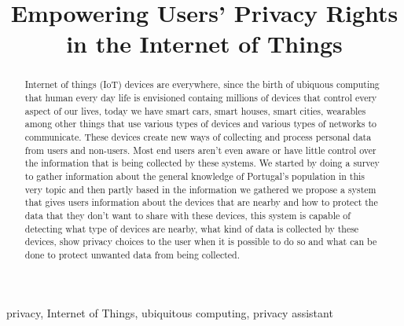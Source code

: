 \documentclass[conference]{IEEEtran}
\begin{document}
\title{Empowering Users' Privacy Rights in the Internet of Things\\
}

\author{
}

\maketitle

\begin{abstract}
Internet of things (IoT) devices are everywhere, since the birth of ubiquous
computing that human every day life is envisioned containg millions of devices
that control every aspect of our lives, today we have smart cars, smart houses,
smart cities, wearables among other things that use various types of devices
and various types of networks to communicate. These devices create new ways 
of collecting and process personal data from users and non-users.
Most end users aren't even aware or have little control over the information that
is being collected by these systems. We started by doing a survey to gather
information about the general knowledge of Portugal's population in this
very topic and then partly based in the information we gathered we propose
a system that gives users information about the devices that are nearby
and how to protect the data that they don't want to share with these devices,
this system is capable of detecting what type of devices are nearby,
what kind of data is collected by these devices, show privacy choices
to the user when it is possible to do so and what can be done to protect
unwanted data from being collected.
\end{abstract}

\begin{IEEEkeywords}
privacy, Internet of Things, ubiquitous computing, privacy assistant
\end{IEEEkeywords}
\end{document}
